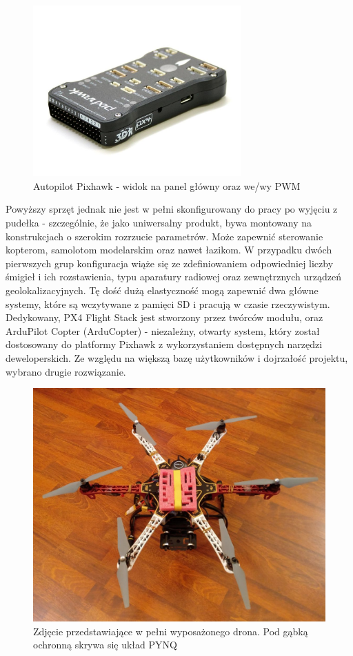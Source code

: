 \begin{figure}[h]
	\centering
	\includegraphics[width=8cm]{5_pixhawk.jpg}
	\caption{Autopilot Pixhawk - widok na panel główny oraz we/wy PWM}
	\label{fig:pixhawk}
\end{figure}

Powyższy sprzęt jednak nie jest w pełni skonfigurowany do pracy po wyjęciu z pudełka - szczególnie, że jako uniwersalny produkt, bywa montowany na konstrukcjach o szerokim rozrzucie parametrów. Może zapewnić sterowanie kopterom, samolotom modelarskim oraz nawet łazikom. W przypadku dwóch pierwszych grup konfiguracja wiąże się ze zdefiniowaniem odpowiedniej liczby śmigieł i ich rozstawienia, typu aparatury radiowej oraz zewnętrznych urządzeń geolokalizacyjnych. Tę dość dużą elastyczność mogą zapewnić dwa główne systemy, które są wczytywane z pamięci SD i pracują w czasie rzeczywistym. Dedykowany, PX4 Flight Stack jest stworzony przez twórców modułu, oraz ArduPilot Copter (ArduCopter) - niezależny, otwarty system, który został dostosowany do platformy Pixhawk z wykorzystaniem dostępnych narzędzi deweloperskich. Ze względu na większą bazę użytkowników i dojrzałość projektu, wybrano drugie rozwiązanie.

\begin{figure}[h]
	\centering
	\captionsetup{justification=centering,margin=1cm}
	\hspace*{0cm}
	\includegraphics[width=14cm]{5_drone_photo.jpg}
	\caption{Zdjęcie przedstawiające w pełni wyposażonego drona. Pod gąbką ochronną skrywa się układ PYNQ}
	\label{fig:drone_photo}
\end{figure}

